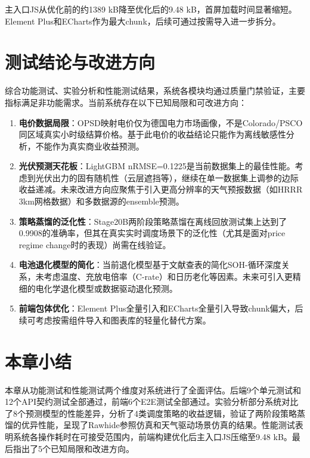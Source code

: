 \documentclass[12pt,a4paper]{ctexbook}
\begin{document}
主入口JS从优化前的约1389 kB降至优化后的9.48 kB，首屏加载时间显著缩短。Element Plus和ECharts作为最大chunk，后续可通过按需导入进一步拆分。

\section{测试结论与改进方向}

综合功能测试、实验分析和性能测试结果，系统各模块均通过质量门禁验证，主要指标满足非功能需求。当前系统存在以下已知局限和可改进方向：

\begin{enumerate}[label=(\arabic*)]
  \item \textbf{电价数据局限}：OPSD映射电价仅为德国电力市场画像，不是Colorado/PSCO同区域真实小时级结算价格。基于此电价的收益结论只能作为离线敏感性分析，不能作为真实商业收益预测。\cite{opsd-datapackage-2020,opsd-wiese-2019}
  \item \textbf{光伏预测天花板}：LightGBM nRMSE=0.1225是当前数据集上的最佳性能。考虑到光伏出力的固有随机性（云层遮挡等），继续在单一数据集上调参的边际收益递减。未来改进方向应聚焦于引入更高分辨率的天气预报数据（如HRRR 3km网格数据）和多数据源的ensemble预测。\cite{lightgbm-2017}
  \item \textbf{策略蒸馏的泛化性}：Stage20B两阶段策略蒸馏在离线回放测试集上达到了0.9908的准确率，但其在真实实时调度场景下的泛化性（尤其是面对price regime change时的表现）尚需在线验证。\cite{policy-distillation-2016}
  \item \textbf{电池退化模型的简化}：当前退化模型基于文献查表的简化SOH-循环深度关系，未考虑温度、充放电倍率（C-rate）和日历老化等因素。未来可引入更精细的电化学退化模型或数据驱动退化预测。\cite{battery-degradation-review-2021,rainflow-soc-2022}
  \item \textbf{前端包体优化}：Element Plus全量引入和ECharts全量引入导致chunk偏大，后续可考虑按需组件导入和图表库的轻量化替代方案。
\end{enumerate}

\section{本章小结}

本章从功能测试和性能测试两个维度对系统进行了全面评估。后端9个单元测试和12个API契约测试全部通过，前端6个E2E测试全部通过。实验分析部分系统对比了8个预测模型的性能差异，分析了4类调度策略的收益逻辑，验证了两阶段策略蒸馏的优异性能，呈现了Rawhide参照仿真和天气驱动场景仿真的结果。性能测试表明系统各操作耗时在可接受范围内，前端构建优化后主入口JS压缩至9.48 kB。最后指出了5个已知局限和改进方向。
\end{document}
